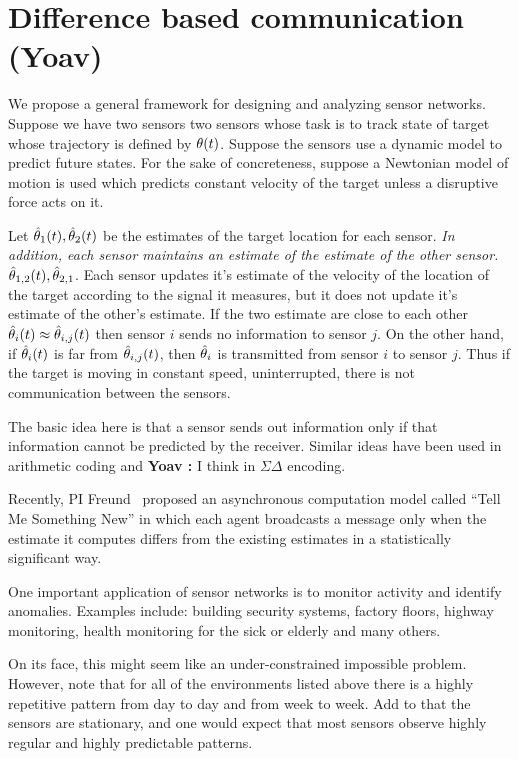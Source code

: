 \documentclass{article}
\newcommand{\comment}[3]{{\color{#1} {\bf #2 :} #3}}
\newcommand{\yoav}[1]{\comment{magenta}{Yoav}{#1}}
\begin{document}
\section{Difference based communication (Yoav)}
We propose a general framework for designing and analyzing sensor networks. Suppose we have two sensors two sensors whose task is to track state of target whose trajectory is defined by $\theta(t)$. Suppose the sensors use a dynamic model to predict future states. For the sake of concreteness, suppose a Newtonian model of motion is used which predicts constant velocity of the target unless a disruptive force acts on it.

Let $\hat{\theta}_1(t),\hat{\theta}_2(t)$ be the estimates of the target location for each sensor. {\em In addition, each sensor maintains an estimate of the estimate of the other sensor.} $\hat{\theta}_{1,2}(t),\hat{\theta}_{2,1}$. Each sensor updates it's estimate of the velocity of the location of the target according to the signal it measures, but it does not update it's estimate of the other's estimate.  If the two estimate are close to each other $\hat{\theta}_i(t) \approx \hat{\theta}_{i,j}(t)$ then sensor $i$ sends no information to sensor $j$. On the other hand, if $\hat{\theta}_i(t)$ is far from $\hat{\theta}_{i,j}(t)$, then $\hat{\theta}_{i}$ is transmitted from sensor 
$i$ to sensor $j$. Thus if the target is moving in constant speed, uninterrupted, there is not communication between the sensors.

The basic idea here is that a sensor sends out information only if
that information cannot be predicted by the receiver. Similar ideas
have been used in arithmetic coding and \yoav{I think} in
$\Sigma\Delta$ encoding.

Recently, PI Freund~\cite{TMSN} proposed an asynchronous computation
model called ``Tell Me Something New'' in which each agent broadcasts
a message only when the estimate it computes differs from the existing
estimates in a statistically significant way.

 One important application of sensor networks is to monitor activity
 and identify anomalies. Examples include: building security systems,
 factory floors, highway monitoring, health monitoring for the sick or
 elderly and many others.

 On its face, this might seem like an under-constrained impossible
 problem. However, note that for all of the environments listed above
 there is a highly repetitive pattern from day to day and from week to
 week. Add to that the sensors are stationary, and one would expect
 that most sensors observe highly regular and highly predictable
 patterns.
 
\end{document}
